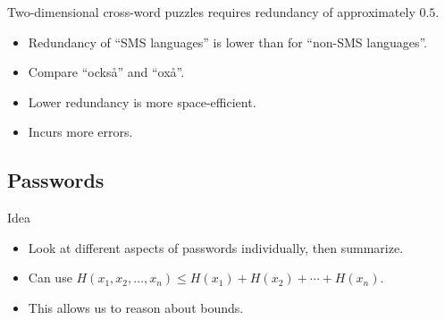 \begin{frame}
  \begin{example}
    Two-dimensional cross-word puzzles requires redundancy of approximately 
    \(0.5\).
  \end{example}

  \begin{example}
    \begin{itemize}
      \item Redundancy of \enquote{SMS languages} is lower than for 
        \enquote{non-SMS languages}.

      \item Compare \enquote{också} and \enquote{oxå}.

    \end{itemize}
  \end{example}

  \begin{remark}
    \begin{itemize}
      \item Lower redundancy is more space-efficient.
      \item Incurs more errors.
    \end{itemize}
  \end{remark}
\end{frame}

%
%
%

\subsection{Passwords}

\begin{frame}
  \begin{block}{Idea~\cite{Komanduri2011opa}}
    \begin{itemize}
      \item Look at different aspects of passwords individually, then 
        summarize.
      \item Can use \(H(x_1, x_2, \ldots, x_n) \leq H(x_1) + H(x_2) + \cdots 
          + H(x_n)\).
      \item This allows us to reason about bounds.
    \end{itemize}
  \end{block}
\end{frame}


